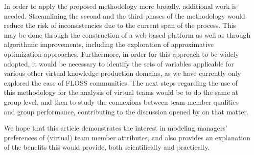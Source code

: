 In order to apply the proposed methodology more broadly, additional work is needed. Streamlining the second and the third phases of the methodology would reduce the risk of inconsistencies due to the current span of the process. This may be done through the construction of a web-based platform as well as through algorithmic improvements, including the exploration of approximative optimization approaches. Furthermore, in order for this approach to be widely adopted, it would be necessary to identify the sets of variables applicable for various other virtual knowledge production domains, as we have currently only explored the case of FLOSS communities. 
The next steps regarding the use of this methodology for the analysis of virtual teams would be to do the same at group level, and then to study the connexions between team member qualities and group performance, contributing to the discussion opened by \cite{KudaravalliFarajJohnson17} on that matter.

We hope that this article demonstrates the interest in modeling managers' preferences of (virtual) team member attributes, and also provides an explanation of the benefits this would provide, both scientifically and practically.


